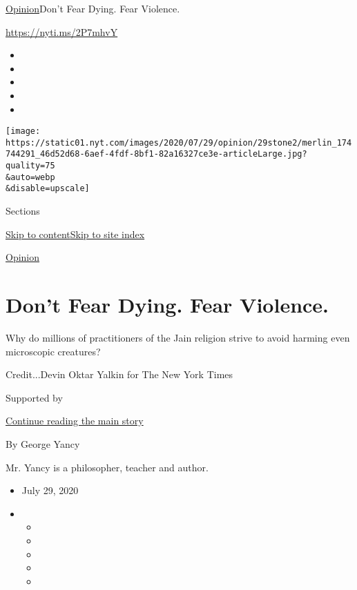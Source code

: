 \href{/section/opinion}{Opinion}\textbar{}Don't Fear Dying. Fear
Violence.

\href{https://nyti.ms/2P7mhvY}{https://nyti.ms/2P7mhvY}

\begin{itemize}
\item
\item
\item
\item
\item
\end{itemize}

\texttt{[image: https://static01.nyt.com/images/2020/07/29/opinion/29stone2/merlin\_174744291\_46d52d68-6aef-4fdf-8bf1-82a16327ce3e-articleLarge.jpg?quality=75\\\&auto=webp\\\&disable=upscale]}

Sections

\protect\hyperlink{site-content}{Skip to
content}\protect\hyperlink{site-index}{Skip to site index}

\href{/section/opinion}{Opinion}

\hypertarget{dont-fear-dying-fear-violence}{%
\section{Don't Fear Dying. Fear
Violence.}\label{dont-fear-dying-fear-violence}}

Why do millions of practitioners of the Jain religion strive to avoid
harming even microscopic creatures?

Credit...Devin Oktar Yalkin for The New York Times

Supported by

\protect\hyperlink{after-sponsor}{Continue reading the main story}

By George Yancy

Mr. Yancy is a philosopher, teacher and author.

\begin{itemize}
\item
  July 29, 2020
\item
  \begin{itemize}
  \item
  \item
  \item
  \item
  \item
  \end{itemize}
\end{itemize}

